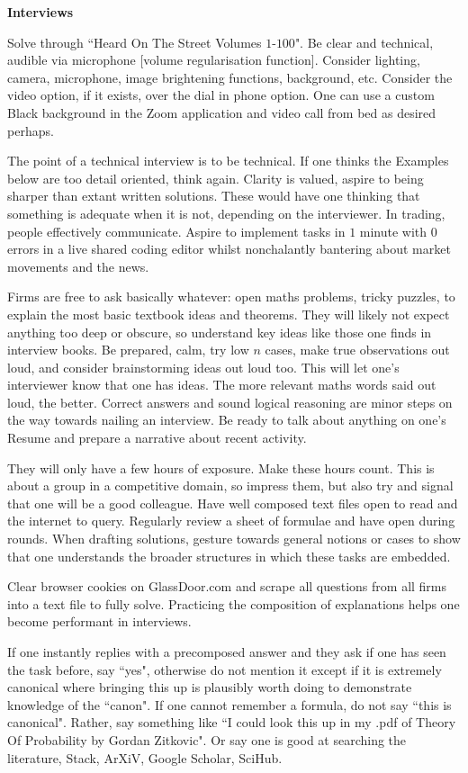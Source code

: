\textbf{Interviews}

Solve through ``Heard On The Street Volumes $1$-$100$". Be clear and technical, audible via microphone [volume regularisation function]. Consider lighting, camera, microphone, image brightening functions, background, etc. Consider the video option, if it exists, over the dial in phone option. One can use a custom Black background in the Zoom application and video call from bed as desired perhaps.

The point of a technical interview is to be technical. If one thinks the Examples below are too detail oriented, think again. Clarity is valued, aspire to being sharper than extant written solutions. These would have one thinking that something is adequate when it is not, depending on the interviewer. In trading, people effectively communicate. Aspire to implement tasks in $1$ minute with $0$ errors in a live shared coding editor whilst nonchalantly bantering about market movements and the news.

Firms are free to ask basically whatever: open maths problems, tricky puzzles, to explain the most basic textbook ideas and theorems. They will likely not expect anything too deep or obscure, so understand key ideas like those one finds in interview books. Be prepared, calm, try low $n$ cases, make true observations out loud, and consider brainstorming ideas out loud too. This will let one's interviewer know that one has ideas. The more relevant maths words said out loud, the better. Correct answers and sound logical reasoning are minor steps on the way towards nailing an interview. Be ready to talk about anything on one's Resume and prepare a narrative about recent activity.

They will only have a few hours of exposure. Make these hours count. This is about a group in a competitive domain, so impress them, but also try and signal that one will be a good colleague. Have well composed text files open to read and the internet to query. Regularly review a sheet of formulae and have open during rounds. When drafting solutions, gesture towards general notions or cases to show that one understands the broader structures in which these tasks are embedded.

Clear browser cookies on GlassDoor.com and scrape all questions from all firms into a text file to fully solve. Practicing the composition of explanations helps one become performant in interviews.

If one instantly replies with a precomposed answer and they ask if one has seen the task before, say ``yes", otherwise do not mention it except if it is extremely canonical where bringing this up is plausibly worth doing to demonstrate knowledge of the ``canon". If one cannot remember a formula, do not say ``this is canonical". Rather, say something like ``I could look this up in my .pdf of Theory Of Probability by Gordan Zitkovic". Or say one is good at searching the literature, Stack, ArXiV, Google Scholar, SciHub.

